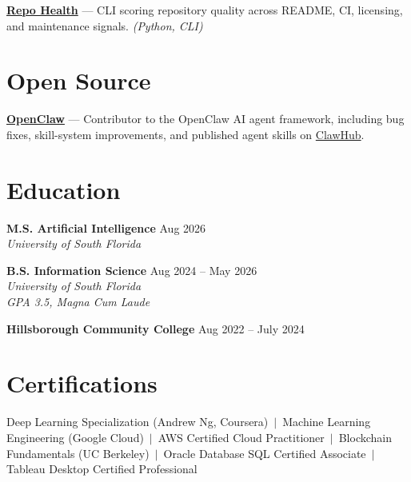 \documentclass[11pt,letterpaper]{article}
\begin{document}
\vspace{3pt}

\textbf{\href{https://github.com/ianalloway/repo-health}{Repo Health}} --- CLI scoring repository quality across README, CI, licensing, and maintenance signals. \textit{(Python, CLI)}

\section{Open Source}
\textbf{\href{https://github.com/openclaw/openclaw}{OpenClaw}} --- Contributor to the OpenClaw AI agent framework, including bug fixes, skill-system improvements, and published agent skills on \href{https://clawhub.ai}{ClawHub}.

\section{Education}

\textbf{M.S. Artificial Intelligence} \hfill Aug 2026 \\
\textit{University of South Florida}

\vspace{3pt}

\textbf{B.S. Information Science} \hfill Aug 2024 -- May 2026 \\
\textit{University of South Florida} \\
\textit{GPA 3.5, Magna Cum Laude}

\vspace{3pt}

\textbf{Hillsborough Community College} \hfill Aug 2022 -- July 2024

\vspace{3pt}

\section{Certifications}
Deep Learning Specialization (Andrew Ng, Coursera) \,$\vert$\,
Machine Learning Engineering (Google Cloud) \,$\vert$\,
AWS Certified Cloud Practitioner \,$\vert$\,
Blockchain Fundamentals (UC Berkeley) \,$\vert$\,
Oracle Database SQL Certified Associate \,$\vert$\,
Tableau Desktop Certified Professional
\end{document}
